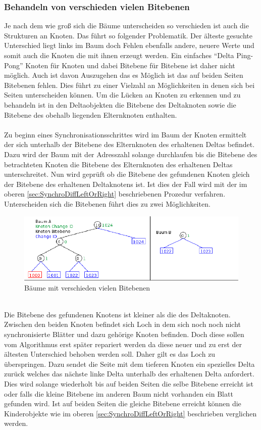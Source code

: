 \documentclass[a4paper,11pt,oneside,%
headsepline,												%
footsepline,												%
bibtotocnumbered									%
]{scrreprt}
\begin{document}
\subsubsection{Behandeln von verschieden vielen Bitebenen} 

Je nach dem wie groß sich die Bäume unterscheiden so verschieden ist auch die Strukturen an Knoten. Das führt so folgender Problematik. Der älteste gesuchte Unterschied liegt links im Baum doch Fehlen ebenfalls andere, neuere Werte und somit auch die Knoten die mit ihnen erzeugt werden. Ein einfaches \enquote{Delta Ping-Pong} Knoten für Knoten und dabei Bitebene für Bitebene ist daher nicht möglich. Auch ist davon Auszugehen das es Möglich ist das auf beiden Seiten Bitebenen fehlen. Dies führt zu einer Vielzahl an Möglichkeiten in denen sich bei Seiten unterscheiden können. Um die Lücken an Knoten zu erkennen und zu behandeln ist in den Deltaobjekten die Bitebene des Deltaknoten sowie die Bitebene des obehalb liegenden Elternknoten enthalten.\\\\
Zu beginn eines Synchronisationsschrittes wird im Baum der Knoten ermittelt der sich unterhalb der Bitebene des Elternknoten des erhaltenen Deltas befindet. Dazu wird der Baum mit der Adresszahl solange durchlaufen bis die Bitebene des betrachteten Knoten die Bitebene des Elternknoten des erhaltenen Deltas unterschreitet. Nun wird geprüft ob die Bitebene des gefundenen Knoten gleich der  Bitebene des erhaltenen Deltaknotens ist. Ist dies der Fall wird mit der im oberen \autoref{sec:SynchroDiffLeftOrRight} beschriebenen Prozedur verfahren. Unterscheiden sich die Bitebenen führt dies zu zwei Möglichkeiten. 
\begin{figure}[h!]
  \begin{center}
    \includegraphics[width=0.9\linewidth]{bilder/case 2 a* B**.png}
  \end{center}
 \caption{Bäume mit verschieden vielen Bitebenen}
\end{figure}\\
Die Bitebene des gefundenen Knotens ist kleiner als die des Deltaknoten. Zwischen den beiden Knoten befindet sich Loch in dem sich noch noch nicht synchronisierte Blätter und dazu gehörige Knoten befinden. Doch diese sollen vom Algorithmus erst später repariert werden da diese neuer und zu erst der ältesten Unterschied behoben werden soll. Daher gilt es das Loch zu überspringen. Dazu sendet die Seite mit dem tieferen Knoten ein spezielles Delta zurück welches das nächste linke Delta unterhalb des erhaltenen Delta anfordert. Dies wird solange wiederholt bis auf beiden Seiten die selbe Bitebene erreicht ist oder falls die kleine Bitebene im anderen Baum nicht vorhanden ein Blatt gefunden wird. Ist auf beiden Seiten die gleiche Bitebene erreicht können die Kinderobjekte wie im oberen \autoref{sec:SynchroDiffLeftOrRight} beschrieben verglichen werden.
\end{document}
